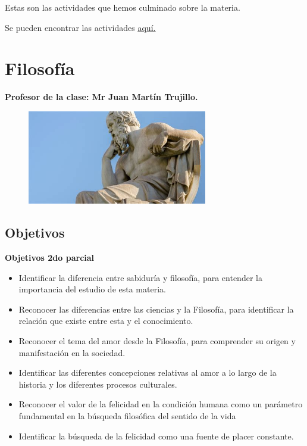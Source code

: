 \documentclass[a4paper, 12pt]{article}
\begin{document}
Estas son las actividades que hemos culminado sobre la materia.

Se pueden encontrar las actividades \href{https://drive.google.com/drive/folders/1Yzkl5f3mAak-WTCwdcppPKqvAjG_teDC?usp=sharing}{\underline{aquí.}}

\section{Filosofía}
\textbf{Profesor de la clase: Mr Juan Martín Trujillo.}

\begin{figure}[h]
  \includegraphics[width=0.7\textwidth, center]{filo.jpeg}
\end{figure}

\subsection{Objetivos}

\textbf{Objetivos 2do parcial}

\begin{itemize}

  \item Identificar la diferencia entre sabiduría y filosofía, para entender la importancia del estudio de esta materia.
  \item Reconocer las diferencias entre las ciencias y la Filosofía, para identificar la relación que existe entre esta y el conocimiento.
  \item Reconocer el tema del amor desde la Filosofía, para comprender su origen y manifestación en la sociedad.
  \item Identificar las diferentes concepciones relativas al amor a lo largo de la historia y los diferentes procesos culturales.
  \item Reconocer el valor de la felicidad en la condición humana como un parámetro fundamental en la búsqueda filosófica del sentido de la vida
  \item Identificar la búsqueda de la felicidad como una fuente de placer constante.

\end{itemize}
\end{document}

